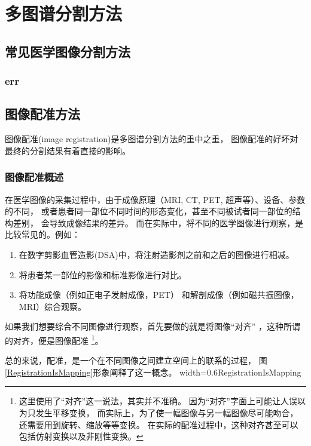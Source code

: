 
\chapter{多图谱分割方法}

\section{常见医学图像分割方法}
\subsection{err}


\section{图像配准方法}
图像配准(image registration)是多图谱分割方法的重中之重，
图像配准的好坏对最终的分割结果有着直接的影响。

\subsection{图像配准概述}
在医学图像的采集过程中，由于成像原理（MRI, CT, PET, 超声等）、设备、参数的不同，
或者患者同一部位不同时间的形态变化，甚至不同被试者同一部位的结构差别，
会导致成像结果的差异。
而在实际中，将不同的医学图像进行观察，是比较常见的。例如：
\begin{enumerate}
  \item 在数字剪影血管造影(DSA)中，将注射造影剂之前和之后的图像进行相减。
  \item 将患者某一部位的影像和标准影像进行对比。
  \item 将功能成像（例如正电子发射成像，PET）%
    和解剖成像（例如磁共振图像，MRI）综合观察。
\end{enumerate}
如果我们想要综合不同图像进行观察，首先要做的就是将图像``对齐''
，这种所谓的对齐，便是图像配准
\footnote{这里使用了``对齐''这一说法，其实并不准确。
因为``对齐''字面上可能让人误以为只发生平移变换，
而实际上，为了使一幅图像与另一幅图像尽可能吻合，
还需要用到旋转、缩放等等变换。
在实际的配准过程中，这种对齐甚至可以包括仿射变换以及非刚性变换。}。

总的来说，配准，是一个在不同图像之间建立空间上的联系的过程，
图\ref{RegistrationIsMapping}形象阐释了这一概念。
%
{width=0.6\textwidth}{RegistrationIsMapping}

